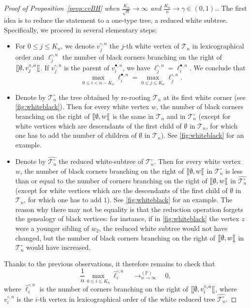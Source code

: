 \documentclass[AHL,XML,longabstracts,Unicode]{cedram}
\renewcommand{\P}{\mathbb{P}}
\def\Ts{\mathscr{T}}
\def\llbracket{[\hspace{-.10em} [ }
\begin{document}
\begin{proof}[Proof of  Proposition~\ref{prop:cvBH}  when $\tfrac{K_{n}}{\sqrt{n}} \rightarrow \infty$ and $ \tfrac{K_{n}}{n}  \rightarrow \gamma \in (0,1)$.]
The first idea is to reduce the statement to a one-type tree, a reduced white subtree.  Specifically, we proceed in several elementary steps:
\begin{itemize}
  \item For $0 \le j\le K_n$, we denote $v^{\circ,n}_{j} $ the $j$-th white vertex of $\Ts_{n}$ in lexicographical order
    and $\ell^{\circ,n}_{j}$ the number of black corners  branching on the right of  $\llbracket \emptyset, v^{\circ,n}_{j} \llbracket$.
    If $v^{\circ,n}_{j}$ is the parent of $v^{\bullet,n}_{i}$, we have $\ell^{\circ,n}_{j}=\ell^{\bullet,n}_{i}$.
    We conclude that
    \[ \max_{0 \leq i < n-K_{n}} \ell^{\bullet,n}_{i}= \max_{0 \leq j \leq  K_{n}} \ell^{\circ,n}_{j}.\]
\item  Denote by $\Ts_{n}^{\circ}$ the tree obtained by re-rooting $\Ts_{n}$ at its first white corner (see \cref{fig:whiteblack}). Then for every white vertex $w$, the number of black corners branching on the right of $\llbracket \emptyset, w \llbracket$ is the same in $ \Ts_{n}$ and in  $\Ts_{n}^{\circ}$ (except for white vertices which are descendants of the first child of $\emptyset$ in $\Ts_{n}$, for which one has to add the number of children of $\emptyset$ in $\Ts_{n}$). See \cref{fig:whiteblack} for an example.
\item Denote by $\hat{\Ts_{n}^{\circ}}$ the reduced white-subtree of $\Ts_{n}^{\circ}$. Then for every white vertex $w$, the number of black corners branching on the right of $\llbracket \emptyset, w \llbracket$ in $\Ts_{n}^{\circ}$ is less than or equal to   the number  of  corners branching on the right of $\llbracket \emptyset, w \llbracket$  in  $\hat{\Ts_{n}^{\circ}}$ (except for white vertices which are the descendants of the first child of $\emptyset$ in $\Ts_{n}$, for which one has to add $1$).  See \cref{fig:whiteblack} for an example. The reason why there may not be equality is that the reduction operation forgets the genealogy of black vertices: for instance, if in \cref{fig:whiteblack} the vertex $z$ were a younger sibling of $w_{2}$, the reduced white subtree would not have changed, but  the number of black corners branching on the right of $\llbracket \emptyset, w \llbracket$ in $\Ts_{n}^{\circ}$ would have increased.
\end{itemize}

Thanks to the previous observations, it therefore remains to check that
\[ \frac{1}{n}  \max_{0 \leq i  \leq K_{n}} \hat{\ell}^{\circ,n}_{i}  \quad \mathop{\longrightarrow}^{(\P)}_{n \rightarrow \infty} \quad 0,\]
where $\hat{\ell}^{\circ,n}_{i}$ is the number of  corners  branching on the right of  $\llbracket \emptyset, v^{\circ,n}_{i} \llbracket$, where $v^{\circ,n}_{i} $ is the $i$-th  vertex in lexicographical order of the white reduced tree $\hat{\Ts^{\circ}_{n}}$.


\end{proof}
\end{document}
